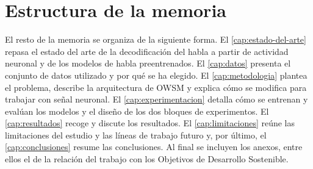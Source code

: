 \section{Estructura de la memoria}
\label{sec:estructura}

El resto de la memoria se organiza de la siguiente forma. El \cref{cap:estado-del-arte} repasa el estado del arte de la decodificación del habla a partir de actividad neuronal y de los modelos de habla preentrenados. El \cref{cap:datos} presenta el conjunto de datos utilizado y por qué se ha elegido. El \cref{cap:metodologia} plantea el problema, describe la arquitectura de OWSM y explica cómo se modifica para trabajar con señal neuronal. El \cref{cap:experimentacion} detalla cómo se entrenan y evalúan los modelos y el diseño de los dos bloques de experimentos. El \cref{cap:resultados} recoge y discute los resultados. El \cref{cap:limitaciones} reúne las limitaciones del estudio y las líneas de trabajo futuro y, por último, el \cref{cap:conclusiones} resume las conclusiones. Al final se incluyen los anexos, entre ellos el de la relación del trabajo con los Objetivos de Desarrollo Sostenible.